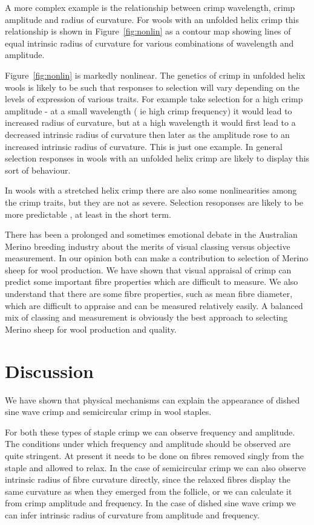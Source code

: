 \documentclass[titlepage,10pt]{article}  %
\begin{document}
A more complex example is the relationship between crimp wavelength, crimp amplitude and radius of curvature. For wools with an unfolded helix crimp this relationship is shown in Figure~\ref{fig:nonlin} as a contour map showing lines of equal intrinsic radius of curvature for various combinations of wavelength and amplitude.



Figure~\ref{fig:nonlin} is markedly nonlinear. The genetics of crimp in unfolded helix wools is likely to be such that responses to selection will vary depending on the levels of expression of various traits. For example take selection for a high crimp amplitude - at a small wavelength ( ie high crimp frequency) it would lead to increased radius of curvature, but at a high wavelength it would first lead to a decreased intrinsic radius of curvature then later as the amplitude rose to an increased intrinsic radius of curvature. This is just one example. In general selection responses in wools with an unfolded helix crimp are likely to display this sort of behaviour. 

In wools with a stretched helix crimp there are also some nonlinearities among the crimp traits, but they are not as severe. Selection resoponses are likely to be more predictable , at least in the short term.

There has been a prolonged and sometimes emotional debate in the Australian Merino breeding industry about the merits of visual classing versus objective measurement. In our opinion both can make a contribution to selection of Merino sheep for wool production. We have shown that visual appraisal of crimp can predict some important fibre properties which are difficult to measure. We also understand that there are some fibre properties, such as mean fibre diameter, which are difficult to appraise and can be measured relatively easily. A balanced mix of classing and measurement is obviously the best approach to selecting Merino sheep for wool production and quality.

\section{Discussion}
We have shown that physical mechanisms can explain the appearance of dished sine wave crimp and semicircular crimp in wool staples.

For both these types of staple crimp we can observe frequency and amplitude. The conditions under which frequency and amplitude should be observed are quite stringent. At present it needs to be done on fibres removed singly from the staple and allowed to relax. In the case of semicircular crimp we can also observe intrinsic radius of fibre curvature directly, since the relaxed fibres display the same curvature as when they emerged from the follicle, or we can calculate it from crimp amplitude and frequency. In the case of dished sine wave crimp we can infer intrinsic radius of curvature from amplitude and frequency.
\end{document}
